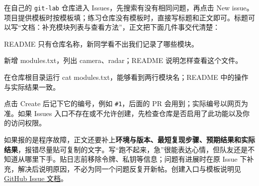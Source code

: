 \begin{example}
在自己的 \texttt{git-lab} 仓库进入 Issues，先搜索有没有相同问题，再点击 New issue。项目提供模板时按模板填；练习仓库没有模板时，直接写标题和正文即可。标题可以写“文档：补充模块列表与查看方法”，正文把下面几件事交代清楚：
\begin{description}[style=nextline]
\item[现状] README 只有仓库名称，新同学看不出我们记录了哪些模块。
\item[希望的结果] 新增 modules.txt，列出 camera、radar；README 说明怎样查看这个文件。
\item[完成标准] 在仓库根目录运行 cat modules.txt，能够看到两行模块名；README 中的操作与实际结果一致。
\end{description}
点击 Create 后记下它的编号，例如 \texttt{\#1}，后面的 PR 会用到；实际编号以网页为准。如果 Issues 入口不存在或不允许创建，先检查仓库是否启用了此功能以及你的访问权限。
\end{example}

如果报的是程序故障，正文还要补上\textbf{环境与版本、最短复现步骤、预期结果和实际结果}，报错尽量贴可复制的文字。写“跑不起来，急”很能表达心情，但队友还是不知道从哪里下手。贴日志前移除令牌、私钥等信息；问题有进展时在原 Issue 下补充，解决后说明原因，不必为同一个问题反复开新帖。创建入口与模板说明见\href{https://docs.github.com/en/issues/tracking-your-work-with-issues/using-issues/creating-an-issue}{GitHub Issue 文档}。

